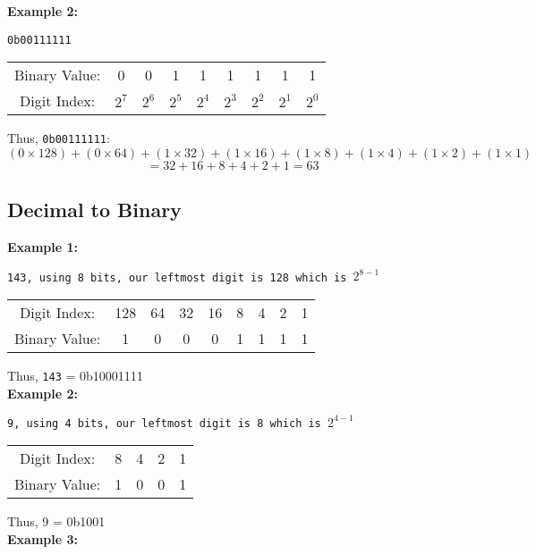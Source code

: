\documentclass{article}
\begin{document}
\noindent \textbf{Example 2:}

\texttt{0b00111111}

\begin{center}
\begin{tabular}{c c c c c c c c c}
Binary Value: & 0 & 0 & 1 & 1 & 1 & 1 & 1 & 1 \\
Digit Index:  & $2^7$ & $2^6$ & $2^5$ & $2^4$ & $2^3$ & $2^2$ & $2^1$ & $2^0$ \\
\end{tabular}
\end{center} 

\noindent Thus, \texttt{0b00111111}:
\[
(0 \times 128) + (0 \times 64) + (1 \times 32) + (1 \times 16) + (1 \times 8) + (1 \times 4) + (1 \times 2) + (1 \times 1)
\]
\[
= 32 + 16 + 8 + 4 + 2 + 1 = 63
\]

\subsection*{Decimal to Binary}
\textbf{Example 1:}

\texttt{143, using 8 bits, our leftmost digit is 128 which is $2^{8-1}$}

\begin{center}
\begin{tabular}{c c c c c c c c c}
Digit Index: & 128 & 64 & 32 & 16 & 8 & 4 & 2 & 1 \\
Binary Value: & 1 & 0 & 0 & 0 & 1 & 1 & 1 & 1 \\
\end{tabular}
\end{center} 

\noindent Thus, \texttt{143} = 0b10001111 \\


\noindent \textbf{Example 2:} 

\texttt{9, using 4 bits, our leftmost digit is 8 which is $2^{4-1}$}

\begin{center}
\begin{tabular}{c c c c c}
Digit Index: & 8 & 4 & 2 & 1 \\
Binary Value: & 1 & 0 & 0 & 1 \\
\end{tabular}
\end{center}

\noindent Thus, 9  = 0b1001 \\

\noindent \textbf{Example 3:}
\end{document}
